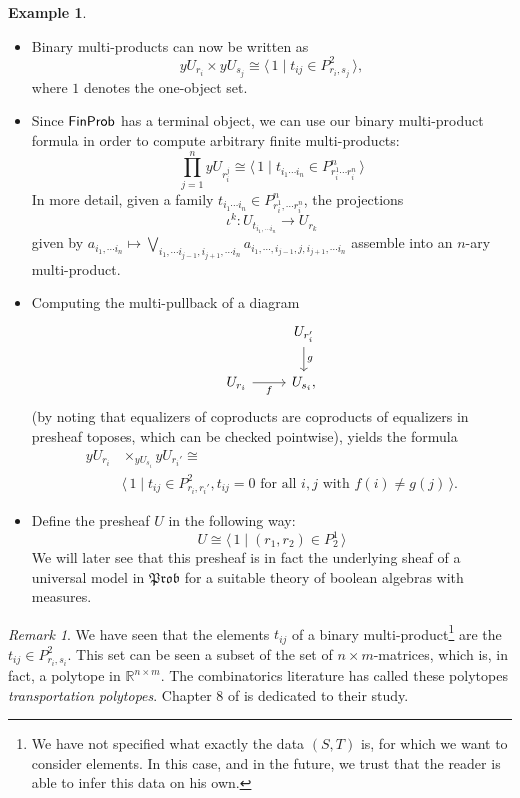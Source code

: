 \documentclass[a4paper]{amsproc}
\theoremstyle{plain}
\theoremstyle{definition}
\newtheorem{example}[theorem]{Example}
\theoremstyle{remark}
\newtheorem{remark}[theorem]{Remark}
\numberwithin{equation}{section}
\newcommand{\y}{\textit{y}}
\newcommand{\FinProb}{\textup{\textsf{FinProb}}}
\newcommand{\Prob}{\mathfrak{Prob}}
\newcommand{\la}{\langle\,}
\newcommand{\ra}{\,\rangle}
\begin{document}
\begin{example} \label{notation_example}
    \mbox{}
    \begin{itemize}
        \item Binary multi-products can now be written as
        \[ \y U_{r_i} \times \y U_{s_j} \cong \la 1 \mid t_{ij} \in P^2_{r_i,s_j} \ra, \]
        where $1$ denotes the one-object set.
        \item Since $\FinProb$ has a terminal object, we can use our binary multi-product formula in order to compute arbitrary finite multi-products:
        \[
            \prod_{j=1}^n \y U_{r_i^j} \cong \la 1 \mid t_{i_1 \cdots i_n} \in P^n_{r_i^1 \cdots r_i^n} \ra
        \]
        In more detail, given a family $t_{i_1\cdots i_n} \in P^n_{r_i^1,\cdots r_i^n}$, the projections
        \[
            \iota^k: U_{t_{i_1,\cdots i_n}} \to U_{r_k}
        \]
        given by $a_{i_1,\cdots i_n} \mapsto \bigvee_{i_1,\cdots i_{j-1}, i_{j+1},\cdots i_n} a_{i_1,\cdots,i_{j-1},j,i_{j+1},\cdots i_n}$ assemble into an $n$-ary multi-product.
        \item Computing the multi-pullback of a diagram
        \[
            \begin{tikzcd}
            & U_{r'_i} \arrow[d, "g"] \\
            U_{r_i} \arrow[r, "f"'] & U_{s_i} ,
            \end{tikzcd}
        \]
        (by noting that equalizers of coproducts are coproducts of equalizers in presheaf toposes, which can be checked pointwise), yields the formula
        \begin{equation*}
            \begin{split}
            \y U_{r_i} &\times_{\y U_{s_i}} \y U_{r_i'} \cong \\
            &\la 1 \mid t_{ij} \in P^2_{r_i, r_i'}, t_{ij} = 0 \text{ for all } i,j \text{ with } f(i) \neq g(j) \ra .
            \end{split}
        \end{equation*}
        \item Define the presheaf $U$ in the following way:
        \[ U \cong \la 1 \mid (r_1,r_2) \in P^1_2 \ra \]
        We will later see that this presheaf is in fact the underlying sheaf of a universal model in $\Prob$ for a suitable theory of boolean algebras with measures.
    \end{itemize}
\end{example}

\begin{remark} We have seen that the elements $t_{ij}$ of a binary multi-product\footnote{We have not specified what exactly the data $(S,T)$ is, for which we want to consider elements. In this case, and in the future, we trust that the reader is able to infer this data on his own.} are the $t_{ij} \in P^2_{r_i,s_i}$. This set can be seen a subset of the set of $n\times m$-matrices, which is, in fact, a polytope in $\mathbb{R}^{n\times m}$. The combinatorics literature has called these polytopes \emph{transportation polytopes}. Chapter 8 of \cite{brualdi2006combinatorial} is dedicated to their study.
\end{remark}
\end{document}
